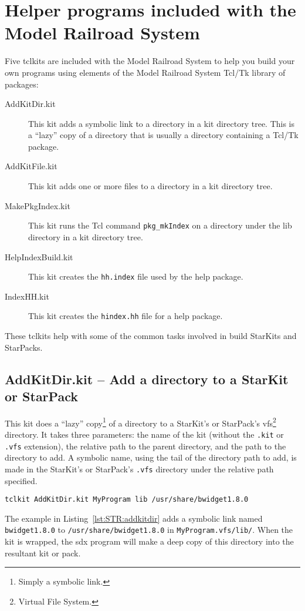 \section{Helper programs included with the Model Railroad System}

Five tclkits are included with the Model Railroad System to help you
build your own programs using elements of the Model Railroad System
Tcl/Tk library of packages:
\begin{description}
\item[AddKitDir.kit] This kit adds a symbolic link to a directory in a
kit directory tree.  This is a ``lazy'' copy of a directory that is usually a
directory containing a Tcl/Tk package.
\item[AddKitFile.kit] This kit adds one or more files to a directory in
a kit directory tree.
\item[MakePkgIndex.kit] This kit runs the Tcl command
\lstinline=pkg_mkIndex= on a directory under the lib directory in a kit
directory tree.
\item[HelpIndexBuild.kit] This kit creates the \lstinline=hh.index= file
used by the help package.
\item[IndexHH.kit] This kit creates the \lstinline=hindex.hh= file for a
help package.
\end{description}
These tclkits help with some of the common tasks involved in build
StarKits and StarPacks.

\subsection{AddKitDir.kit -- Add a directory to a StarKit or StarPack}

This kit does a ``lazy'' copy\footnote{Simply a symbolic link.} of a
directory to a StarKit's or StarPack's vfs\footnote{Virtual File System.}
directory.  It takes three parameters: the name of the kit (without the
\lstinline=.kit= or \lstinline=.vfs= extension), the relative path to
the parent directory, and the path to the directory to add.  A symbolic name,
using the tail of the directory path to add, is made in the StarKit's or
StarPack's \lstinline=.vfs= directory under the relative path specified.

\begin{lstlisting}[label={lst:STR:addkitdir},caption={Adding a directory
to a kit.}]
tclkit AddKitDir.kit MyProgram lib /usr/share/bwidget1.8.0
\end{lstlisting}

The example in Listing~\ref{lst:STR:addkitdir} adds a symbolic link
named \lstinline=bwidget1.8.0= to \lstinline=/usr/share/bwidget1.8.0= in
\lstinline=MyProgram.vfs/lib/=. When the kit is wrapped, the sdx program
will make a deep copy of this directory into the resultant kit or pack.

